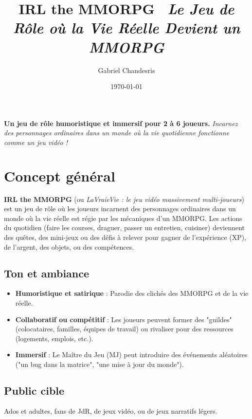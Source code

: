 \documentclass[11pt, a4paper]{article}
\title{\Huge \textbf{IRL the MMORPG} ~\newline \large \textit{Le Jeu de Rôle où la Vie Réelle Devient un MMORPG}}
\author{Gabriel Chandesris}
\date{\today}
\begin{document}
\maketitle

\vspace{2cm}
\begin{center}
    \large \textbf{Un jeu de rôle humoristique et immersif pour 2 à 6 joueurs.} 
    \large \textit{Incarnez des personnages ordinaires dans un monde où la vie quotidienne fonctionne comme un jeu vidéo !}
\end{center}

\newpage

\tableofcontents
\newpage

\section{Concept général}
\textbf{IRL the MMORPG} (ou \textit{LaVraieVie : le jeu vidéo massivement multi-joueurs}) est un jeu de rôle où les joueurs incarnent des personnages ordinaires dans un monde où la vie réelle est régie par les mécaniques d'un MMORPG. Les actions du quotidien (faire les courses, draguer, passer un entretien, cuisiner) deviennent des quêtes, des mini-jeux ou des défis à relever pour gagner de l'expérience (XP), de l'argent, des objets, ou des compétences.

\subsection{Ton et ambiance}
\begin{itemize}
    \item \textbf{Humoristique et satirique} : Parodie des clichés des MMORPG et de la vie réelle.
    \item \textbf{Collaboratif ou compétitif} : Les joueurs peuvent former des "guildes" (colocataires, familles, équipes de travail) ou rivaliser pour des ressources (logements, emplois, etc.).
    \item \textbf{Immersif} : Le Maître du Jeu (MJ) peut introduire des événements aléatoires ("un bug dans la matrice", "une mise à jour du monde").
\end{itemize}

\subsection{Public cible}
Ados et adultes, fans de JdR, de jeux vidéo, ou de jeux narratifs légers.
\end{document}
